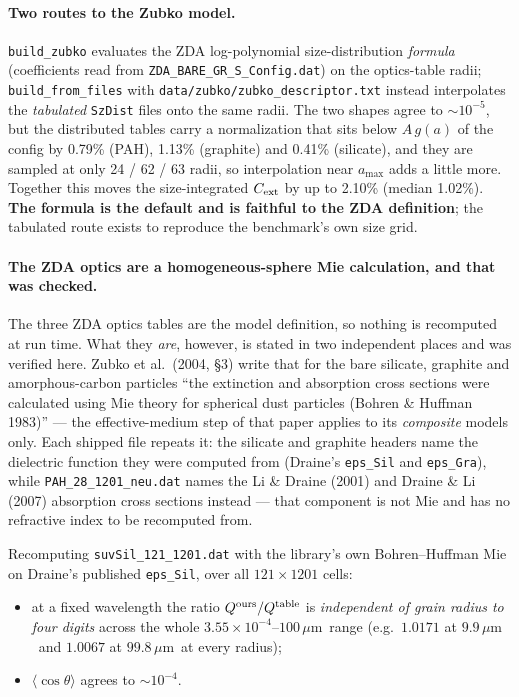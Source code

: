 \documentclass{my_memo}
\newcommand{\code}[1]{\texttt{#1}}
\newcommand{\um}{\ensuremath{\,\mu\mathrm{m}}}
\begin{document}
\paragraph{Two routes to the Zubko model.} \code{build\_zubko} evaluates the ZDA
log-polynomial size-distribution \emph{formula} (coefficients read from
\code{ZDA\_BARE\_GR\_S\_Config.dat}) on the optics-table radii;
\code{build\_from\_files} with \code{data/zubko/zubko\_descriptor.txt} instead
interpolates the \emph{tabulated} \code{SzDist} files onto the same radii. The
two shapes agree to $\sim10^{-5}$, but the distributed tables carry a
normalization that sits below $A\,g(a)$ of the config by 0.79\% (PAH), 1.13\%
(graphite) and 0.41\% (silicate), and they are sampled at only 24 / 62 / 63
radii, so interpolation near $a_{\max}$ adds a little more. Together this moves
the size-integrated $C_{\rm ext}$ by up to 2.10\% (median 1.02\%). \textbf{The
formula is the default and is faithful to the ZDA definition}; the tabulated
route exists to reproduce the benchmark's own size grid.

\paragraph{The ZDA optics are a homogeneous-sphere Mie calculation, and that was
checked.}\label{sec:zubko-mie}
The three ZDA optics tables are the model definition, so nothing is recomputed at
run time. What they \emph{are}, however, is stated in two independent places and
was verified here. Zubko et al.\ (2004, \S3) write that for the bare silicate,
graphite and amorphous-carbon particles ``the extinction and absorption cross
sections were calculated using Mie theory for spherical dust particles (Bohren
\& Huffman 1983)'' --- the effective-medium step of that paper applies to its
\emph{composite} models only. Each shipped file repeats it: the silicate and
graphite headers name the dielectric function they were computed from
(Draine's \code{eps\_Sil} and \code{eps\_Gra}), while
\code{PAH\_28\_1201\_neu.dat} names the Li \& Draine (2001) and Draine \& Li
(2007) absorption cross sections instead --- that component is not Mie and has
no refractive index to be recomputed from.

Recomputing \code{suvSil\_121\_1201.dat} with the library's own
Bohren--Huffman Mie on Draine's published \code{eps\_Sil}, over all
$121\times1201$ cells:

\begin{itemize}
\item at a fixed wavelength the ratio $Q^{\rm ours}/Q^{\rm table}$ is
      \emph{independent of grain radius to four digits} across the whole
      $3.55\times10^{-4}$--$100$\um\ range (e.g.\ $1.0171$ at $9.9$\um\ and
      $1.0067$ at $99.8$\um\ at every radius);
\item $\langle\cos\theta\rangle$ agrees to $\sim10^{-4}$.
\end{itemize}
\end{document}
